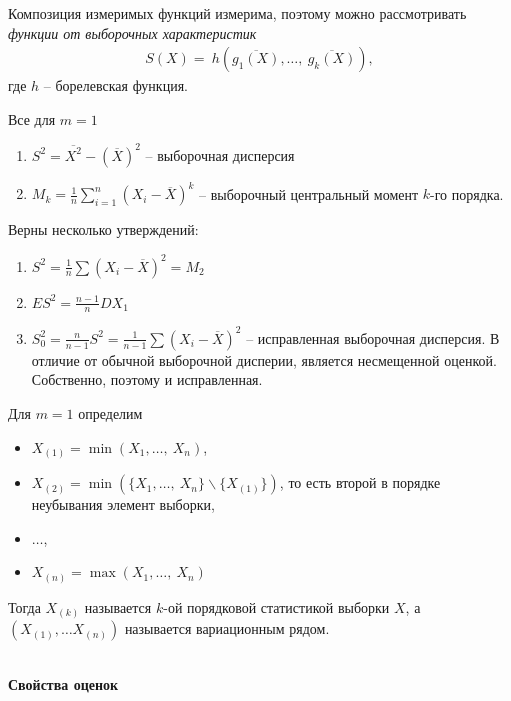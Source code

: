 Композиция измеримых функций измерима, поэтому можно рассмотривать \textit{функции от выборочных характеристик}
\begin{gather*}
    S( X) =\ h\left(\overline{g_{1}( X)} ,\dotsc,\ \overline{g_{k}( X)}\right),
\end{gather*}
где $h$ -- борелевская функция.
\begin{example}
Все для $\displaystyle m=1$
\begin{enumerate}
    \item $\displaystyle S^{2} =\overline{X^{2}} -(\overline{X})^{2}$ -- выборочная дисперсия
    
    \item $\displaystyle M_{k} =\frac{1}{n}\sum _{i=1}^n( X_{i} -\overline{X})^{k}$ -- выборочный центральный момент $\displaystyle k$-го порядка.
\end{enumerate}
\end{example}
\begin{note}
Верны несколько утверждений: 
\begin{enumerate}
    \item $\displaystyle S^{2} = \frac{1}{n}\sum(X_i - \overline{X})^2 = M_{2}$
    \item $E S^2 = \frac{n-1}{n} DX_1$
    \item $S_0^2 = \frac{n}{n-1}S^2 = \frac{1}{n-1}\sum(X_i - \overline{X})^2$ -- исправленная выборочная дисперсия. В отличие от обычной выборочной дисперии, является несмещенной оценкой. Собственно, поэтому и исправленная.
\end{enumerate}
\end{note}
\begin{definition}
Для $\displaystyle m=1$ определим
\begin{itemize}
    \item $X_{( 1)} =\min( X_{1} ,\dotsc ,\ X_{n})$,
    \item $X_{( 2)} =\min(\{X_{1},\dotsc,\ X_{n}\} \backslash \{X_{( 1)}\})$, то есть второй в порядке неубывания элемент выборки,
    \item $\dotsc$,
    \item $X_{( n)} =\max( X_{1}, \dotsc,\ X_{n})$
\end{itemize}
Тогда $\displaystyle X_{( k)}$ называется $\displaystyle k$-ой порядковой статистикой выборки $\displaystyle X$, а $\displaystyle ( X_{( 1)} ,\dotsc X_{( n)})$ называется вариационным рядом.
\end{definition}\\
\textbf{Свойства оценок}\\


